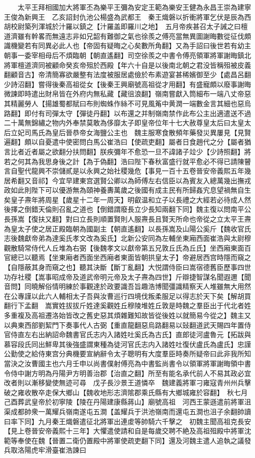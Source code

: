 　　太平王拜相國加大將軍丕為樂平王彌為安定王範為樂安王健為永昌王崇為建寧王俊為新興王　乙亥詔封仇池公楊盛為武都王　秦王熾磐以折衝將軍乞伏是辰為西胡校尉築列渾城於汁羅以鎮之【汁羅盖即羅川之地】　五月帝疾甚召太子誡之曰檀道濟雖有幹畧而無遠志非如兄韶有難御之氣也徐羨之傅亮當無異圖謝晦數從征伐頗識機變若有同異必此人也【帝固有疑晦之心矣數所角翻】又為手詔曰後世若有幼主朝事一委宰相母后不煩臨朝【朝直遙翻】司空徐羨之中書令傅亮領軍將軍謝晦鎮北將軍檀道濟同被顧命癸亥帝殂於西殿【年六十自是以後南北朝之君没皆稱殂被皮義翻顧音古】帝清簡寡欲嚴整有法度被服居處儉於布素遊宴甚稀嬪御至少【處昌呂翻少詩沼翻】嘗得後秦高祖從女【後秦王興廟號高祖從才用翻】有盛寵頗以廢事謝晦微諫即時遣出財帛皆在外府内無私藏【藏徂浪翻】嶺南嘗獻入筒細布一端八丈帝惡其精麗勞人【揚雄蜀都賦曰布則蜘蛛作絲不可見風䇶中黄潤一端數金言其細也惡烏路翻】即付有司彈太守【彈徒丹翻】以布還之并制嶺南禁作此布公主出適遣送不過二十萬無錦繡之物内外奉禁莫敢為侈靡太子即皇帝位年十七大赦尊皇太后曰太皇太后立妃司馬氏為皇后晉恭帝女海鹽公主也　魏主服寒食散頻年藥發災異屢見【見賢遍翻】頗以自憂遣中使密問白馬公崔浩曰【使疏吏翻】屬者日食趙代之分【屬者猶言比者近者屬之欲翻分扶問翻】朕疾彌年不愈恐一旦不諱諸子竝少【少詩照翻】將若之何其為我思身後之計【為于偽翻】浩曰陛下春秋富盛行就平愈必不得已請陳瞽言自聖代龍興不崇儲貳是以永興之始社稷幾危【事見一百十五卷晉安帝義熙五年幾居希翻又音祁】今宜早建東宫選賢公卿以為師傅左右信臣以為賓友入總萬幾出撫戎政如此則陛下可以優游無為頤神養夀萬歲之後國有成主民有所歸姦宄息望禍無自生矣皇子燾年將周星【歲星十二年一周天】明叡温和立子以長禮之大經若必待成人然後擇之倒錯天倫則召亂之道也【倒錯謂廢長立少長知兩翻下同】魏主復以問南平公長孫嵩【復扶又翻】對曰立長則順置賢則人服燾長且賢天所命也帝從之立太平王燾為皇太子使之居正殿臨朝為國副主【朝直遙翻】以長孫嵩及山陽公奚斤【魏收官氏志後魏獻帝弟為達奚氏孝文改為奚氏】北新公安同為左輔坐東廂西面崔浩與太尉穆觀散騎常侍代人丘堆為右弼【後魏孝文以獻帝第五兄敦丘氏為丘氏】坐西廂東面百官總已以聽焉【坐東廂者西面坐西廂者東面皆朝拱皇太子】帝避居西宫時隱而窺之【自隱蔽其身而窺之也】聽其決斷【斷丁亂翻】大悦謂侍臣曰嵩宿德舊臣歷事四世功存社稷【嵩事昭成帝及道武帝明元帝及太子燾為四世】斤辯捷智謀名聞遐邇【聞音問】同曉解俗情明練於事觀達於政要識吾旨趣浩博聞彊識精察天人堆雖無大用然在公專謹以此六人輔相太子吾與汝曹巡行四境伐叛柔服足以得志於天下矣【解胡買翻行下孟翻　嵩實姓拔拔斤姓達奚觀姓丘穆陵堆姓丘敦是時魏之羣臣出于代北者姓多重複及高祖遷洛始皆改之舊史惡其煩雜難知故皆從後姓以就簡易今從之】魏主又以典東西部劉絜門下奏事代人古弼【重直龍翻惡烏路翻易以䜴翻道武天賜四年置侍官侍直左右出納詔命魏書官氏志内入諸姓吐奚氏為古氏】直郎徒河盧魯元【拓跋與慕容段氏同出鮮卑其後強盛謂東種為徒河官氏志内入諸姓吐復伏盧氏為盧氏】忠謹公勤使之給侍東宫分典機要宣納辭令太子聰明有大度羣臣時奏所疑帝曰此非我所知當決之汝曹國主也六月壬申以尚書僕射傅亮為中書監尚書令以領軍將軍謝晦領中書令侍中謝方明為丹陽尹方明善治郡【治直之翻】所至有能名承代前人不易其政必宜改者則以漸移變使無迹可尋　戊子長沙景王道憐卒　魏建義將軍刁雍寇青州州兵擊破之雍收散卒走保大鄉山【魏收地形志濟隂郡乘氏縣有大鄉城雍於容翻】　秋七月己酉葬武皇帝於初寧陵【陵在丹陽建康縣蔣山】廟號高祖　河西王蒙遜遣前將軍沮渠成都帥衆一萬耀兵嶺南遂屯五澗【盖耀兵于洪池嶺南而還屯五澗也沮子余翻帥讀曰率下同】九月秦王熾磐遣征北將軍出連䖍等帥騎六千擊之　初魏主聞高祖克長安【見上卷晉安帝義熙十三年】大懼遣使請和自是每歲交聘不絶及高祖殂殿中將軍沈範等奉使在魏【晉置二衛仍置殿中將軍使疏吏翻下同】還及河魏主遣人追執之議發兵取洛陽虎牢滑臺崔浩諫曰